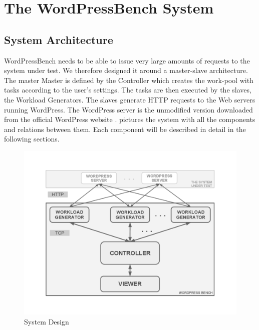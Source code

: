 \chapter{The WordPressBench System}
\label{chapter:chapter4}


\section{System Architecture}
\label{sub-sec:system-architecture}

WordPressBench needs to be able to issue very large amounts of requests to the system under test. We therefore designed it around a master-slave architecture. The master Master is defined by the Controller which creates the work-pool with tasks according to the user's settings. The tasks are then executed by the slaves, the Workload Generators. The slaves generate HTTP requests to the Web servers running WordPress. The WordPress server is the unmodified version downloaded from the official WordPress website \cite{Wordpress-download}.  pictures the system with all the components and relations between them. Each component will be described in detail in the following sections.

  \begin{figure}[htb]
    \begin{center}
    \includegraphics[trim=2.5cm 2.5cm 2.5cm 2.5cm, clip=true, scale=0.65]{src/img/WordPressBench.pdf}
    \caption{System Design}
    \end{center}
  \label{figure:system-design}
  \end{figure}

